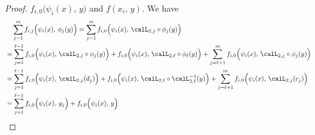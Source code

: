 \documentclass[review,hidelinks,onefignum,onetabnum]{siamart250211}
\begin{document}
\begin{proof}
\(f_{i,0}\big( \psi_i(x), \, y\big)\) and \(f( x_i, \, y)\).
We have 
{\small\begin{equation*}
    \begin{split}
          &\phantom{=\;}\sum_{j=1}^m f_{i,j}\Big( \psi_i(x), \, \phi_j(y)\Big)
        = \sum_{j=1}^m f_{i,0}\Big(\psi_i(x),\, \calL_{2,j}\circ \phi_j(y)\Big)\\
        &=
        \sum_{j=1}^{\ell-1} f_{i,0}\Big(\psi_i(x),\, \calL_{2,j}\circ \phi_j(y)\Big)
        +f_{i,0}\Big(\psi_i(x),\, \calL_{2,\ell }\circ \phi_\ell(y)\Big)
        +      \sum_{j=\ell+1}^m f_{i,0}\Big(\psi_i(x),\, \calL_{2,j}\circ \phi_j(y)\Big)
        \\
        &=
        \sum_{j=1}^{\ell-1} f_{i,0}\Big(\psi_i(x),\, \calL_{2,j}(d_j)\Big)
        +f_{i,0}\Big(\psi_i(x),\, \calL_{2,\ell }\circ \calL_{2,\ell }^{-1}(y)\Big)
        +
        \sum_{j=\ell +1}^m f_{i,0}\Big(\psi_i(x),\, \calL_{2,j}(c_j)\Big)
        \\
        &=
        \sum_{j=1}^{\ell-1} f_{i,0}\Big(\psi_i(x),\, y_j\Big)
        +f_{i,0}\Big(\psi_i(x),\, y\Big)

\end{split}
\end{equation*}}
\end{proof}
\end{document}
